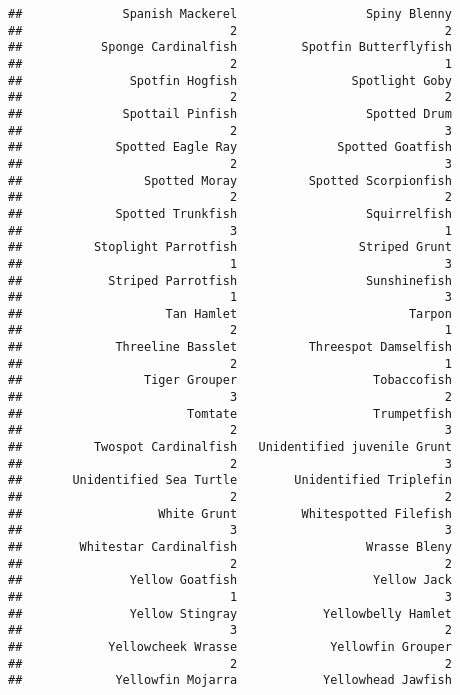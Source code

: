 \documentclass[
]{article}
\begin{document}
\begin{verbatim}
##              Spanish Mackerel                  Spiny Blenny 
##                             2                             2 
##           Sponge Cardinalfish         Spotfin Butterflyfish 
##                             2                             1 
##               Spotfin Hogfish                Spotlight Goby 
##                             2                             2 
##              Spottail Pinfish                  Spotted Drum 
##                             2                             3 
##             Spotted Eagle Ray              Spotted Goatfish 
##                             2                             3 
##                 Spotted Moray          Spotted Scorpionfish 
##                             2                             2 
##             Spotted Trunkfish                  Squirrelfish 
##                             3                             1 
##          Stoplight Parrotfish                 Striped Grunt 
##                             1                             3 
##            Striped Parrotfish                  Sunshinefish 
##                             1                             3 
##                    Tan Hamlet                        Tarpon 
##                             2                             1 
##             Threeline Basslet          Threespot Damselfish 
##                             2                             1 
##                 Tiger Grouper                   Tobaccofish 
##                             3                             2 
##                       Tomtate                   Trumpetfish 
##                             2                             3 
##          Twospot Cardinalfish   Unidentified juvenile Grunt 
##                             2                             3 
##       Unidentified Sea Turtle        Unidentified Triplefin 
##                             2                             2 
##                   White Grunt         Whitespotted Filefish 
##                             3                             3 
##        Whitestar Cardinalfish                  Wrasse Bleny 
##                             2                             2 
##               Yellow Goatfish                   Yellow Jack 
##                             1                             3 
##               Yellow Stingray            Yellowbelly Hamlet 
##                             3                             2 
##            Yellowcheek Wrasse             Yellowfin Grouper 
##                             2                             2 
##             Yellowfin Mojarra            Yellowhead Jawfish 

\end{verbatim}
\end{document}

